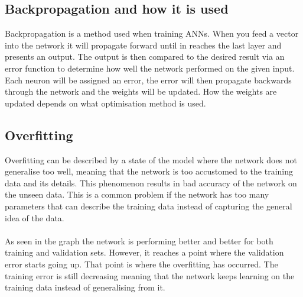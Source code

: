 \subsection{Backpropagation and how it is used}\label{backpropagation}
Backpropagation is a method used when training ANNs. When you feed a vector into the network it will propagate forward until in reaches the last layer and presents an output. The output is then compared to the desired result via an error function to determine how well the network performed on the given input. Each neuron will be assigned an error, the error will then propagate backwards through the network and the weights will be updated. How the weights are updated depends on what optimisation method is used.

\subsection{Overfitting}
Overfitting can be described by a state of the model where the network does not generalise too well, meaning that the network is too accustomed to the training data and its details. This phenomenon results in bad accuracy of the network on the unseen data. This is a common problem if the network has too many parameters that can describe the training data instead of capturing the general idea of the data. \\
 \\
As seen in the graph the network is performing better and better for both training and validation sets. However, it reaches a point where the validation error starts going up. That point is where the overfitting has occurred. The training error is still decreasing meaning that the network keeps learning on the training data instead of generalising from it. 

